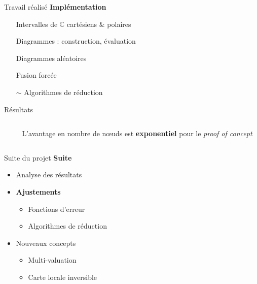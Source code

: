 \documentclass[french, 12pt]{beamer}
\begin{document}
\begin{frame}{Travail réalisé}
    \textbf{Implémentation}
    \begin{itemize}
        \item[\checkmark] Intervalles de $\mathbb C$ cartésiens \& polaires
        \item[\checkmark] Diagrammes : construction, évaluation
        \item[\checkmark] Diagrammes aléatoires
        \item[\checkmark] Fusion forcée
        \item[$\sim$] Algorithmes de réduction
    \end{itemize}
\end{frame}

\begin{frame}{Résultats}
    \begin{columns}
        \begin{column}{0.6\textwidth}
                \end{column}
        \begin{column}{0.4\textwidth}
            L'avantage en nombre de nœuds est \textbf{exponentiel} pour le \textit{proof of concept}
        \end{column}
    \end{columns}
\end{frame}

\begin{frame}{Suite du projet}
\textbf{Suite}
\begin{itemize}
    \item Analyse des résultats
    \item \textbf{Ajustements}
    \begin{itemize}
        \item Fonctions d'erreur
        \item Algorithmes de réduction
    \end{itemize}
    \item Nouveaux concepts
    \begin{itemize}
        \item Multi-valuation
        \item Carte locale inversible
    \end{itemize}
\end{itemize}
\end{frame}
\end{document}
